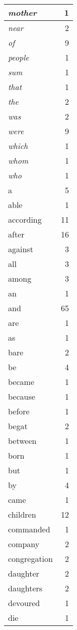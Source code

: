 \begin{center}
\begin{longtable}{l|r}
\emph{mother} & 1\\ \hline 
\emph{near} & 2\\ \hline 
\emph{of} & 9\\ \hline 
\emph{people} & 1\\ \hline 
\emph{sum} & 1\\ \hline 
\emph{that} & 1\\ \hline 
\emph{the} & 2\\ \hline 
\emph{was} & 2\\ \hline 
\emph{were} & 9\\ \hline 
\emph{which} & 1\\ \hline 
\emph{whom} & 1\\ \hline 
\emph{who} & 1\\ \hline 
a & 5\\ \hline 
able & 1\\ \hline 
according & 11\\ \hline 
after & 16\\ \hline 
against & 3\\ \hline 
all & 3\\ \hline 
among & 3\\ \hline 
an & 1\\ \hline 
and & 65\\ \hline 
are & 1\\ \hline 
as & 1\\ \hline 
bare & 2\\ \hline 
be & 4\\ \hline 
became & 1\\ \hline 
because & 1\\ \hline 
before & 1\\ \hline 
begat & 2\\ \hline 
between & 1\\ \hline 
born & 1\\ \hline 
but & 1\\ \hline 
by & 4\\ \hline 
came & 1\\ \hline 
children & 12\\ \hline 
commanded & 1\\ \hline 
company & 2\\ \hline 
congregation & 2\\ \hline 
daughter & 2\\ \hline 
daughters & 2\\ \hline 
devoured & 1\\ \hline 
die & 1\\ \hline 

\end{longtable}
\end{center}
